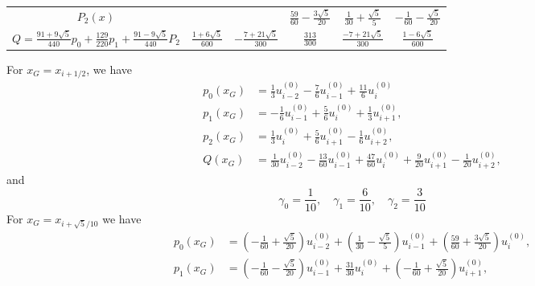 \documentclass{book}
\begin{document}
\begin{example}
\begin{example}{}{}
\begin{example}
\begin{example}
\begin{example}
\begin{table}[htbp]
\begin{tabular}{cccccc}
        $P_2(x)$                                                                        &                                     &                                     & $\frac{59}{60}-\frac{3\sqrt{5}}{20}$  & $\frac{1}{30}+\frac{\sqrt{5}}{5}$   & $-\frac{1}{60}-\frac{\sqrt{5}}{20}$ \\
        $Q=\frac{91+9\sqrt{5}}{440}p_0+\frac{129}{220}p_1+\frac{91-9\sqrt{5}}{440}P_2 $ & $\frac{1+6\sqrt{5}}{600}$           & $-\frac{7+21\sqrt{5}}{300}$         & $\frac{313}{300}$                     & $\frac{-7+21\sqrt{5}}{300}$         & $\frac{1-6\sqrt{5}}{600}$           \\
        \bottomrule
    \end{tabular}
\end{table}

For $x_{G}=x_{i+1 / 2}$, we have
\begin{equation}
    \begin{aligned}
        p_{0}\left(x_{G}\right) & =\frac{1}{3} u_{i-2}^{(0)}-\frac{7}{6} u_{i-1}^{(0)}+\frac{11}{6} u_{i}^{(0)}                                                            \\
        p_{1}\left(x_{G}\right) & =-\frac{1}{6} u_{i-1}^{(0)}+\frac{5}{6} u_{i}^{(0)}+\frac{1}{3} u_{i+1}^{(0)},                                                           \\
        p_{2}\left(x_{G}\right) & =\frac{1}{3} u_{i}^{(0)}+\frac{5}{6} u_{i+1}^{(0)}-\frac{1}{6} u_{i+2}^{(0)},                                                            \\
        Q\left(x_{G}\right)     & =\frac{1}{30} u_{i-2}^{(0)}-\frac{13}{60} u_{i-1}^{(0)}+\frac{47}{60} u_{i}^{(0)}+\frac{9}{20} u_{i+1}^{(0)}-\frac{1}{20} u_{i+2}^{(0)},
    \end{aligned}
\end{equation}
and
\begin{equation}
    \gamma_{0}=\frac{1}{10}, \quad \gamma_{1}=\frac{6}{10}, \quad \gamma_{2}=\frac{3}{10}
\end{equation}
For  $x_{G}=x_{i+\sqrt{5} / 10}$  we have
\begin{equation}
    \begin{aligned}
        p_{0}\left(x_{G}\right) & =\left(-\frac{1}{60}+\frac{\sqrt{5}}{20}\right) u_{i-2}^{(0)}+\left(\frac{1}{30}-\frac{\sqrt{5}}{5}\right) u_{i-1}^{(0)}+\left(\frac{59}{60}+\frac{3 \sqrt{5}}{20}\right) u_{i}^{(0)},       \\
        p_{1}\left(x_{G}\right) & =\left(-\frac{1}{60}-\frac{\sqrt{5}}{20}\right) u_{i-1}^{(0)}+\frac{31}{30} u_{i}^{(0)}+\left(-\frac{1}{60}+\frac{\sqrt{5}}{20}\right) u_{i+1}^{(0)},                                        \\

\end{aligned}
\end{equation}
\end{example}
\end{example}
\end{example}
\end{example}
\end{example}
\end{document}
